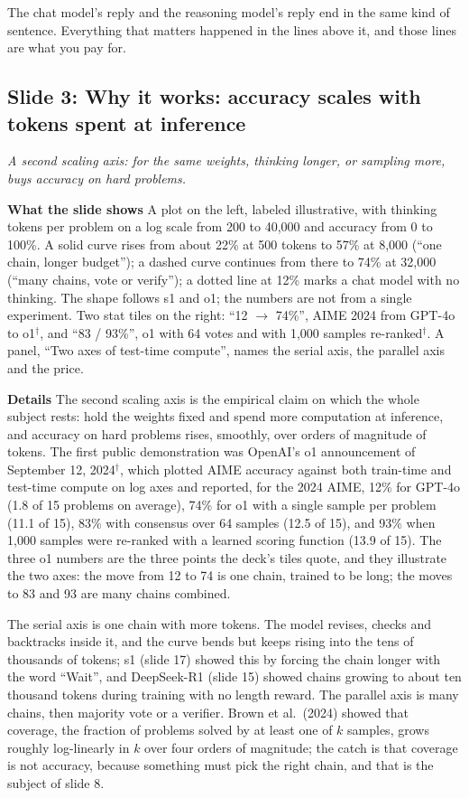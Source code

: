\documentclass[11pt,letterpaper]{article}
\newcommand{\slide}[3]{%
  \subsection[Slide #1: #2]{Slide #1: #2}%
  {\color{muted}\itshape #3\par}\medskip}
\newcommand{\para}[1]{\medskip\noindent\textbf{#1}\quad}
\newenvironment{intuition}{\begin{tcolorbox}[intuitionbox]}{\end{tcolorbox}}
\begin{document}
\begin{intuition}
The chat model's reply and the reasoning model's reply end in the same kind of sentence. Everything that matters happened in the lines above it, and those lines are what you pay for.
\end{intuition}

\slide{3}{Why it works: accuracy scales with tokens spent at inference}{A second scaling axis: for the same weights, thinking longer, or sampling more, buys accuracy on hard problems.}

\para{What the slide shows} A plot on the left, labeled illustrative, with thinking tokens per problem on a log scale from 200 to 40,000 and accuracy from 0 to 100\%. A solid curve rises from about 22\% at 500 tokens to 57\% at 8,000 (``one chain, longer budget''); a dashed curve continues from there to 74\% at 32,000 (``many chains, vote or verify''); a dotted line at 12\% marks a chat model with no thinking. The shape follows s1 and o1; the numbers are not from a single experiment. Two stat tiles on the right: ``12 $\to$ 74\%'', AIME 2024 from GPT-4o to o1$^\dagger$, and ``83 / 93\%'', o1 with 64 votes and with 1,000 samples re-ranked$^\dagger$. A panel, ``Two axes of test-time compute'', names the serial axis, the parallel axis and the price.

\para{Details} The second scaling axis is the empirical claim on which the whole subject rests: hold the weights fixed and spend more computation at inference, and accuracy on hard problems rises, smoothly, over orders of magnitude of tokens. The first public demonstration was OpenAI's o1 announcement of September 12, 2024$^\dagger$, which plotted AIME accuracy against both train-time and test-time compute on log axes and reported, for the 2024 AIME, 12\% for GPT-4o (1.8 of 15 problems on average), 74\% for o1 with a single sample per problem (11.1 of 15), 83\% with consensus over 64 samples (12.5 of 15), and 93\% when 1,000 samples were re-ranked with a learned scoring function (13.9 of 15). The three o1 numbers are the three points the deck's tiles quote, and they illustrate the two axes: the move from 12 to 74 is one chain, trained to be long; the moves to 83 and 93 are many chains combined.

The serial axis is one chain with more tokens. The model revises, checks and backtracks inside it, and the curve bends but keeps rising into the tens of thousands of tokens; s1 (slide 17) showed this by forcing the chain longer with the word ``Wait'', and DeepSeek-R1 (slide 15) showed chains growing to about ten thousand tokens during training with no length reward. The parallel axis is many chains, then majority vote or a verifier. Brown et al.\ (2024) showed that coverage, the fraction of problems solved by at least one of $k$ samples, grows roughly log-linearly in $k$ over four orders of magnitude; the catch is that coverage is not accuracy, because something must pick the right chain, and that is the subject of slide 8.
\end{document}

